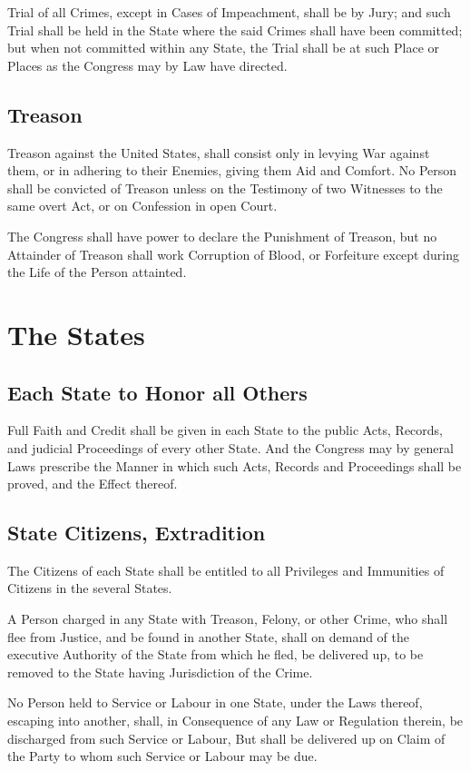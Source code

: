 \documentclass{constitution}
\begin{document}
Trial of all Crimes, except in Cases of Impeachment, shall be by Jury;
and such Trial shall be held in the State where the said Crimes shall have been committed;
but when not committed within any State,
the Trial shall be at such Place or Places as the Congress may by Law have directed.

\section{Treason}
Treason against the United States, shall consist only in levying War against them,
or in adhering to their Enemies, giving them Aid and Comfort.
No Person shall be convicted of Treason
unless on the Testimony of two Witnesses to the same overt Act,
or on Confession in open Court.

The Congress shall have power to declare the Punishment of Treason,
but no Attainder of Treason shall work Corruption of Blood, or Forfeiture
except during the Life of the Person attainted.

\chapter{The States}
\section{Each State to Honor all Others}
Full Faith and Credit shall be given in each State
to the public Acts, Records, and judicial Proceedings of every other State.
And the Congress may by general Laws prescribe the Manner
in which such Acts, Records and Proceedings shall be proved, and the Effect thereof.

\section{State Citizens, Extradition}
The Citizens of each State shall be entitled
to all Privileges and Immunities of Citizens in the several States.

A Person charged in any State with Treason, Felony, or other Crime,
who shall flee from Justice, and be found in another State,
shall on demand of the executive Authority of the State from which he fled,
be delivered up, to be removed to the State having Jurisdiction of the Crime.

No Person held to Service or Labour in one State, under the Laws thereof,
escaping into another,
shall, in Consequence of any Law or Regulation therein,
be discharged from such Service or Labour,
But shall be delivered up on Claim of the Party to whom such Service or Labour may be due.
\end{document}
